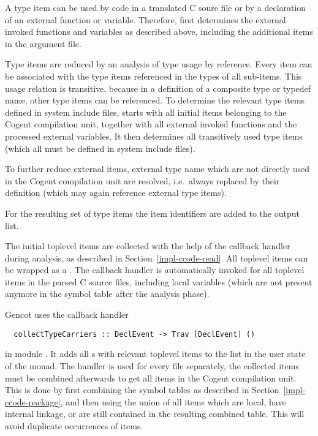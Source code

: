 A type item can be used by code in a translated C soure file or by a declaration of an external function or variable.
Therefore,  first determines the external invoked functions and variables as described above, including
the additional items in the argument file.

Type items are reduced by an analysis of type usage by reference. Every item can be
associated with the type items referenced in the types of all sub-items. This usage relation is transitive, because 
in a definition of a composite type or typedef name, other type items can be referenced. To determine the relevant 
type items defined in system include files,  starts with all initial items belonging
to the Cogent compilation unit, together with all external invoked functions and the processed external variables. 
It then determines all transitively used type items (which all must be defined in system include files).

To further reduce external items, external type name which are not directly used in the Cogent compilation unit are
resolved, i.e.~always replaced by their definition (which may again reference external type items).

For the resulting set of type items the item identifiers are added to the output list. 

The initial toplevel items are collected with the help of the callback handler during analysis, as described in 
Section~\ref{impl-ccode-read}. All toplevel items can be wrapped as a . The callback handler 
is automatically invoked for all toplevel items in the parsed
C source files, including local variables (which are not present anymore in the symbol table after the analysis phase).

Gencot uses the callback handler
\begin{verbatim}
  collectTypeCarriers :: DeclEvent -> Trav [DeclEvent] ()
\end{verbatim}
in module . It adds all s with relevant toplevel items to the list in the 
user state of the  monad. The handler is used for every  file separately, the collected
items must be combined afterwards to get all items in the Cogent compilation unit. This is
done by first combining the symbol tables as described in Section~\ref{impl-ccode-package}, and then using the union of all 
items which are local, have internal linkage, or are still contained in the resulting combined table. 
This will avoid duplicate occurrences of items.

